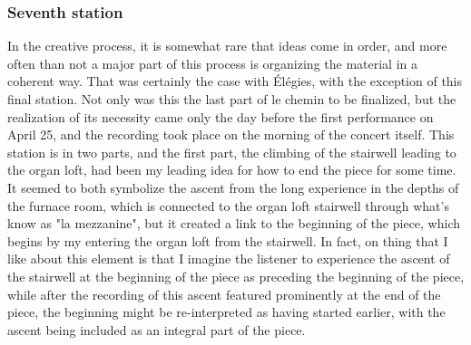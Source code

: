\documentclass[12pt,twoside,maitrise]{dms_ks}
\theoremstyle{definition}
\begin{document}

\subsubsection{Seventh station}

In the creative process, it is somewhat rare that ideas come in order, and more often than not a major part of this process is organizing the material in a coherent way. That was certainly the case with Élégies, with the exception of this final station. Not only was this the last part of le chemin to be finalized, but the realization of its necessity came only the day before the first performance on April 25, and the recording took place on the morning of the concert itself. This station is in two parts, and the first part, the climbing of the stairwell leading to the organ loft, had been my leading idea for how to end the piece for some time. It seemed to both symbolize the ascent from the long experience in the depths of the furnace room, which is connected to the organ loft stairwell through what's know as "la mezzanine", but it created a link to the beginning of the piece, which begins by my entering the organ loft from the stairwell. In fact, on thing that I like about this element is that I imagine the listener to experience the ascent of the stairwell at the beginning of the piece as preceding the beginning of the piece, while after the recording of this ascent featured prominently at the end of the piece, the beginning might be re-interpreted as having started earlier, with the ascent being included as an integral part of the piece.
\end{document}
